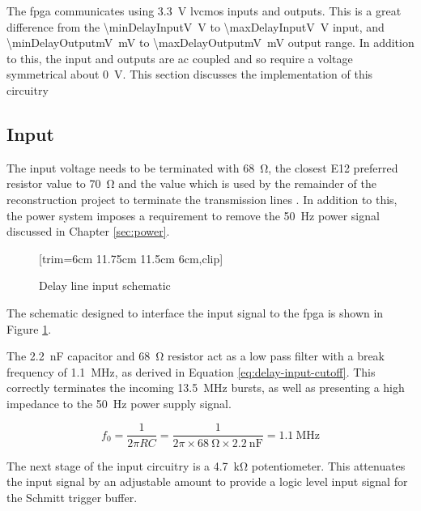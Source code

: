 The \gls{fpga} communicates using \SI{3.3}{\volt} \gls{lvcmos} inputs and outputs. This is a great difference from the \SI{\minDelayInputV}{\volt} to \SI{\maxDelayInputV}{\volt} input, and \SI{\minDelayOutputmV}{\milli\volt} to \SI{\maxDelayOutputmV}{\milli\volt} output range. In addition to this, the input and outputs are \gls{ac} coupled and so require a voltage symmetrical about \SI{0}{\volt}. This section discusses the implementation of this circuitry

\subsection{Input} \label{sec:delay-line-ana-in}

The input voltage needs to be terminated with \SI{68}{\ohm}, the closest E12 preferred resistor value to \SI{70}{\ohm} and the value which is used by the remainder of the reconstruction project to terminate the transmission lines \cite{burton2014b}. In addition to this, the power system imposes a requirement to remove the \SI{50}{\hertz} power signal discussed in Chapter \ref{sec:power}.

\begin{figure}[ht]
	\centering
	[trim={6cm 11.75cm 11.5cm 6cm},clip] %
	\caption{Delay line input schematic}
	\label{fig:delay-line-input-sch}
\end{figure}

The schematic designed to interface the input signal to the \gls{fpga} is shown in Figure \ref{fig:delay-line-input-sch}.

The \SI{2.2}{\nano\farad} capacitor and \SI{68}{\ohm} resistor act as a low pass filter with a break frequency of \SI{1.1}{\mega\hertz}, as derived in Equation \ref{eq:delay-input-cutoff}. This correctly terminates the incoming \SI{13.5}{\mega\hertz} bursts, as well as presenting a high impedance to the \SI{50}{\hertz} power supply signal.

\begin{equation}
f_0 = \frac{1}{2\pi RC} = \frac{1}{2\pi \times \SI{68}{\ohm} \times \SI{2.2}{\nano\farad}} = \SI{1.1}{\mega\hertz} \label{eq:delay-input-cutoff}
\end{equation}

The next stage of the input circuitry is a \SI{4.7}{\kilo\ohm} potentiometer. This attenuates the input signal by an adjustable amount to provide a logic level input signal for the Schmitt trigger buffer.

